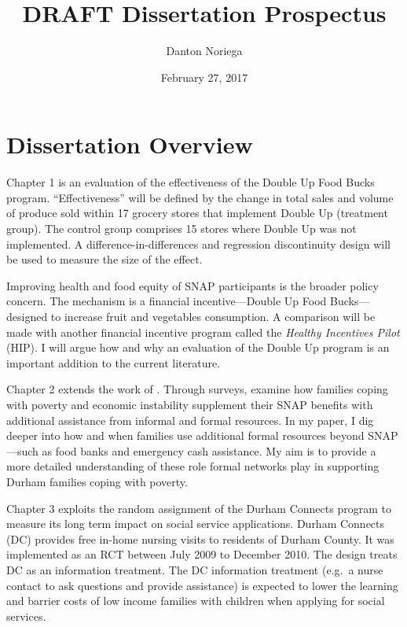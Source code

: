 \documentclass[12pt,letterpaperpaper,]{book}
\title{DRAFT Dissertation Prospectus}
\author{Danton Noriega}
\date{February 27, 2017}
\begin{document}
\maketitle

\setlength{\abovedisplayskip}{-5pt}
\setlength{\abovedisplayshortskip}{-5pt}
\mainmatter

{
\setcounter{tocdepth}{2}
\tableofcontents
}
\chapter*{Dissertation Overview}\label{dissertation-overview}

Chapter 1 is an evaluation of the effectiveness of the Double Up Food
Bucks program. ``Effectiveness'' will be defined by the change in total
sales and volume of produce sold within 17 grocery stores that implement
Double Up (treatment group). The control group comprises 15 stores where
Double Up was not implemented. A difference-in-differences and
regression discontinuity design will be used to measure the size of the
effect.

Improving health and food equity of SNAP participants is the broader
policy concern. The mechanism is a financial incentive---Double Up Food
Bucks---designed to increase fruit and vegetables consumption. A
comparison will be made with another financial incentive program called
the \emph{Healthy Incentives Pilot} (HIP). I will argue how and why an
evaluation of the Double Up program is an important addition to the
current literature.

Chapter 2 extends the work of \citet{schenck-fontaine_use_2016}. Through
surveys, \citet{schenck-fontaine_use_2016} examine how families coping
with poverty and economic instability supplement their SNAP benefits
with additional assistance from informal and formal resources. In my
paper, I dig deeper into how and when families use additional formal
resources beyond SNAP---such as food banks and emergency cash
assistance. My aim is to provide a more detailed understanding of these
role formal networks play in supporting Durham families coping with
poverty.

Chapter 3 exploits the random assignment of the Durham Connects program
to measure its long term impact on social service applications. Durham
Connects (DC) provides free in-home nursing visits to residents of
Durham County. It was implemented as an RCT between July 2009 to
December 2010. The design treats DC as an information treatment. The DC
information treatment (e.g.~a nurse contact to ask questions and provide
assistance) is expected to lower the learning and barrier costs of low
income families with children when applying for social services.
\end{document}
